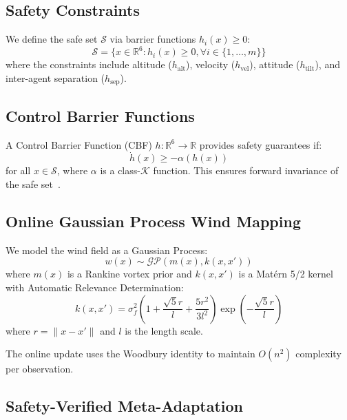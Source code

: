 \subsection{Safety Constraints}

We define the safe set $\mathcal{S}$ via barrier functions $h_i(x) \geq 0$:
\begin{equation}
    \mathcal{S} = \{x \in \mathbb{R}^6 : h_i(x) \geq 0, \forall i \in \{1, \ldots, m\}\}
\end{equation}
where the constraints include altitude ($h_{\text{alt}}$), velocity ($h_{\text{vel}}$), attitude ($h_{\text{tilt}}$), and inter-agent separation ($h_{\text{sep}}$).

\subsection{Control Barrier Functions}

A Control Barrier Function (CBF) $h: \mathbb{R}^6 \to \mathbb{R}$ provides safety guarantees if:
\begin{equation}
    \dot{h}(x) \geq -\alpha(h(x))
\end{equation}
for all $x \in \mathcal{S}$, where $\alpha$ is a class-$\mathcal{K}$ function. This ensures forward invariance of the safe set~\cite{ames2014control}.

\subsection{Online Gaussian Process Wind Mapping}

\label{sec:gp_wind}

We model the wind field as a Gaussian Process:
\begin{equation}
    w(x) \sim \mathcal{GP}(m(x), k(x, x'))
\end{equation}
where $m(x)$ is a Rankine vortex prior and $k(x, x')$ is a Matérn 5/2 kernel with Automatic Relevance Determination:
\begin{equation}
    k(x, x') = \sigma_f^2 \left(1 + \frac{\sqrt{5}r}{l} + \frac{5r^2}{3l^2}\right) \exp\left(-\frac{\sqrt{5}r}{l}\right)
\end{equation}
where $r = \|x - x'\|$ and $l$ is the length scale.

The online update uses the Woodbury identity to maintain $O(n^2)$ complexity per observation.

\subsection{Safety-Verified Meta-Adaptation}

